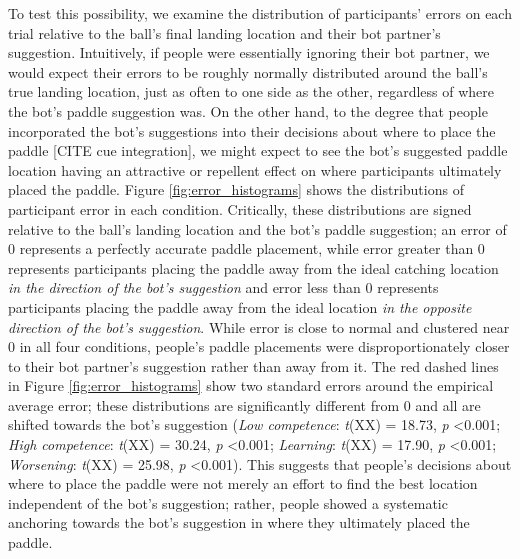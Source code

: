 \documentclass[10pt,letterpaper]{article}
\begin{document}
To test this possibility, we examine the distribution of participants' errors on each trial relative to the ball's final landing location and their bot partner's suggestion. Intuitively, if people were essentially ignoring their bot partner, we would expect their errors to be roughly normally distributed around the ball's true landing location, just as often to one side as the other, regardless of where the bot's paddle suggestion was. On the other hand, to the degree that people incorporated the bot's suggestions into their decisions about where to place the paddle [CITE cue integration], we might expect to see the bot's suggested paddle location having an attractive or repellent effect on where participants ultimately placed the paddle. Figure \ref{fig:error_histograms} shows the distributions of participant error in each condition. Critically, these distributions are signed relative to the ball's landing location and the bot's paddle suggestion; an error of 0 represents a perfectly accurate paddle placement, while error greater than 0 represents participants placing the paddle away from the ideal catching location \textit{in the direction of the bot's suggestion} and error less than 0 represents participants placing the paddle away from the ideal location \textit{in the opposite direction of the bot's suggestion}. While error is close to normal and clustered near 0 in all four conditions, people's paddle placements were disproportionately closer to their bot partner's suggestion rather than away from it. The red dashed lines in Figure \ref{fig:error_histograms} show two standard errors around the empirical average error; these distributions are significantly different from 0 and all are shifted towards the bot's suggestion (\textit{Low competence}: \textit{t}(XX) = 18.73, \textit{p} \textless{0.001}; \textit{High competence}: \textit{t}(XX) = 30.24, \textit{p} \textless{0.001}; \textit{Learning}: \textit{t}(XX) = 17.90, \textit{p} \textless{0.001}; \textit{Worsening}: \textit{t}(XX) = 25.98, \textit{p} \textless{0.001}). This suggests that people's decisions about where to place the paddle were not merely an effort to find the best location independent of the bot's suggestion; rather, people showed a systematic anchoring towards the bot's suggestion in where they ultimately placed the paddle.  
\end{document}

